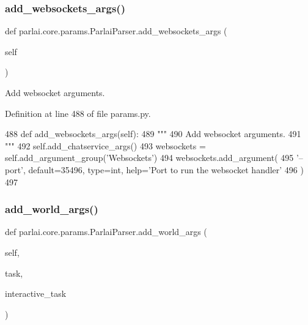 \subsubsection{\texorpdfstring{add\+\_\+websockets\+\_\+args()}{add\_websockets\_args()}}
{\footnotesize\ttfamily def parlai.\+core.\+params.\+Parlai\+Parser.\+add\+\_\+websockets\+\_\+args (\begin{DoxyParamCaption}\item[{}]{self }\end{DoxyParamCaption})}

\begin{DoxyVerb}Add websocket arguments.
\end{DoxyVerb}
 

Definition at line 488 of file params.\+py.


\begin{DoxyCode}
488     \textcolor{keyword}{def }add\_websockets\_args(self):
489         \textcolor{stringliteral}{"""}
490 \textcolor{stringliteral}{        Add websocket arguments.}
491 \textcolor{stringliteral}{        """}
492         self.add\_chatservice\_args()
493         websockets = self.add\_argument\_group(\textcolor{stringliteral}{'Websockets'})
494         websockets.add\_argument(
495             \textcolor{stringliteral}{'--port'}, default=35496, type=int, help=\textcolor{stringliteral}{'Port to run the websocket handler'}
496         )
497 
\end{DoxyCode}
\mbox{\label{classparlai_1_1core_1_1params_1_1ParlaiParser_adb8c8064530f9cf9be57ab533360079c}} 
\subsubsection{\texorpdfstring{add\+\_\+world\+\_\+args()}{add\_world\_args()}}
{\footnotesize\ttfamily def parlai.\+core.\+params.\+Parlai\+Parser.\+add\+\_\+world\+\_\+args (\begin{DoxyParamCaption}\item[{}]{self,  }\item[{}]{task,  }\item[{}]{interactive\+\_\+task }\end{DoxyParamCaption})}

